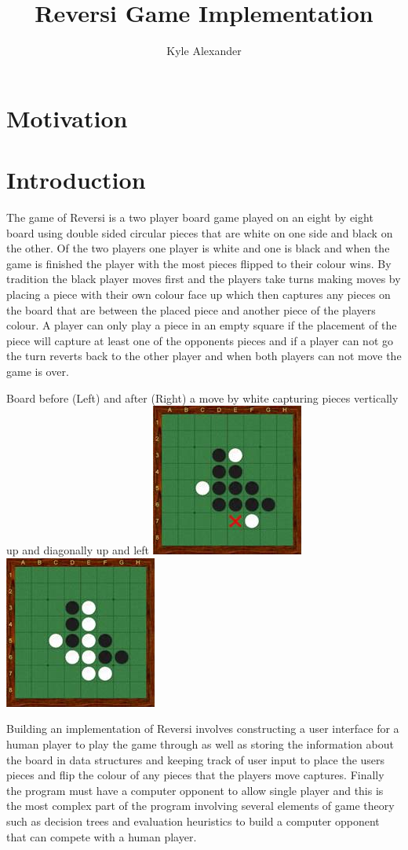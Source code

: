 \documentclass[final]{cmpreport}
\title{Reversi Game Implementation}
\author{Kyle Alexander}
\begin{document}
\section{Motivation}
\section{Introduction}
The game of Reversi is a two player board game played on an eight by eight board using double sided circular pieces that are white on one side and black on the other. Of the two players one player is white and one is black and when the game is finished the player with the most pieces flipped to their colour wins. By tradition the black player moves first and the players take turns making moves by placing a piece with their own colour face up which then captures any pieces on the board that are between the placed piece and another piece of the players colour. A player can only play a piece in an empty square if the placement of the piece will capture at least one of the opponents pieces and if a player can not go the turn reverts back to the other player and when both players can not move the game is over.
\begin{cmpfigure}[htb]{Board before (Left) and after (Right) a move by white capturing pieces vertically up and diagonally up and left}
	\includegraphics{othelloturn1.jpg}
	\includegraphics{othelloturn2.jpg}
\end{cmpfigure}
\FloatBarrier
Building an implementation of Reversi involves constructing a user interface for a human player to play the game through as well as storing the information about the board in data structures and keeping track of user input to place the users pieces and flip the colour of any pieces that the players move captures. Finally the program must have a computer opponent to allow single player and this is the most complex part of the program involving several elements of game theory such as decision trees and evaluation heuristics to build a computer opponent that can compete with a human player.
\end{document}
